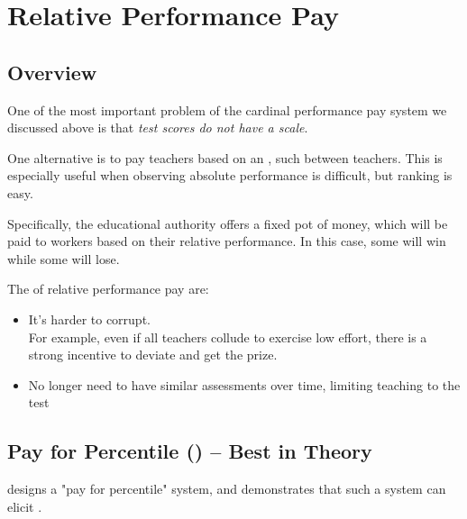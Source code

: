 \section{Relative Performance Pay}

    \subsection{Overview}

        One of the most important problem of the cardinal performance pay system we discussed above is that \emph{test scores do not have a scale}.

        One alternative is to pay teachers based on an , such  between teachers. This is especially useful when observing absolute performance is difficult, but ranking is easy.

        Specifically, the educational authority offers a fixed pot of money, which will be paid to workers based on their relative performance. In this case, some will win while some will lose.

        The  of relative performance pay are:
        \begin{itemize}
            \item It's harder to corrupt.\\
            For example, even if all teachers collude to exercise low effort, there is a strong incentive to deviate and get the prize.
            \item No longer need to have similar assessments over time, limiting teaching to the test
        \end{itemize}

    \subsection{Pay for Percentile (\cite{barlevy_pay_2012}) -- Best in Theory}

        \cite{barlevy_pay_2012} designs a "pay for percentile" system, and demonstrates that such a system can elicit .

